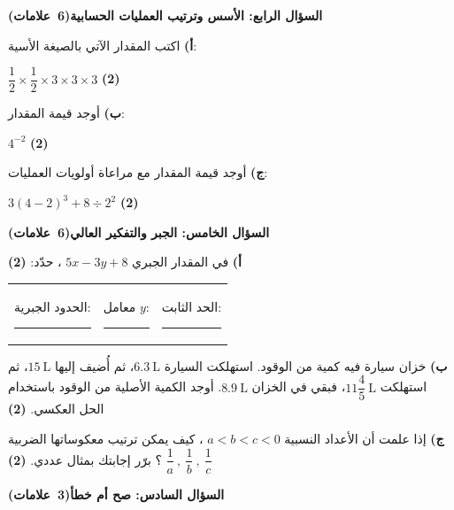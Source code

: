 \documentclass[12pt, a4paper]{article}
\newcommand{\question}[2]{%
  \par\vspace{0.25cm}\noindent
  \colorbox{gray!15}{\parbox{\dimexpr\linewidth-2\fboxsep\relax}{\textbf{\large #1}\hfill\mbox{\textbf{(#2)}}}}%
  \par\vspace{0.15cm}}
\newcommand{\pts}[1]{\hfill\mbox{\textbf{(#1)}}}
\newcommand{\sub}[3]{%
  \textbf{#1)} #2\par\vspace{#3}}
\begin{document}
\newpage
\question{السؤال الرابع: الأسس وترتيب العمليات الحسابية}{6 علامات}

\noindent
\begin{minipage}[t]{0.32\linewidth}
\sub{أ}{اكتب المقدار الآتي بالصيغة الأسية: \par\vspace{0.1cm}
\centering $\dfrac{1}{2} \times \dfrac{1}{2} \times 3 \times 3 \times 3$ \pts{2}}{2.3cm}
\end{minipage}\hfill\vrule\hfill
\begin{minipage}[t]{0.32\linewidth}
\sub{ب}{أوجد قيمة المقدار: \par\vspace{0.1cm}
\centering $4^{-2}$ \pts{2}}{2.3cm}
\end{minipage}\hfill\vrule\hfill
\begin{minipage}[t]{0.32\linewidth}
\sub{ج}{أوجد قيمة المقدار مع مراعاة أولويات العمليات: \par\vspace{0.1cm}
\centering $3(4-2)^3 + 8 \div 2^2$ \pts{2}}{2.3cm}
\end{minipage}

\question{السؤال الخامس: الجبر والتفكير العالي}{6 علامات}

\textbf{أ)} في المقدار الجبري $5x - 3y + 8$ ، حدّد: \pts{2} \par\vspace{0.2cm}
\noindent\begin{tabularx}{\linewidth}{XXX}
الحدود الجبرية: \rule{2.6cm}{0.4pt} & معامل $y$: \rule{2.6cm}{0.4pt} & الحد الثابت: \rule{2.6cm}{0.4pt}
\end{tabularx}
\vspace{0.3cm}

\textbf{ب)} خزان سيارة فيه كمية من الوقود. استهلكت السيارة $6.3\ \mathrm{L}$، ثم أُضيف إليها $15\ \mathrm{L}$، ثم استهلكت $11\dfrac{4}{5}\ \mathrm{L}$، فبقي في الخزان $8.9\ \mathrm{L}$. أوجد الكمية الأصلية من الوقود باستخدام الحل العكسي. \pts{2}
\vspace{2.8cm}

\textbf{ج)} إذا علمت أن الأعداد النسبية $a < b < c < 0$ ، كيف يمكن ترتيب معكوساتها الضربية
$\dfrac{1}{a} \ ,\ \dfrac{1}{b} \ ,\ \dfrac{1}{c}$ ؟ برّر إجابتك بمثال عددي. \pts{2}
\vspace{2.8cm}

\question{السؤال السادس: صح أم خطأ}{3 علامات}
\end{document}
